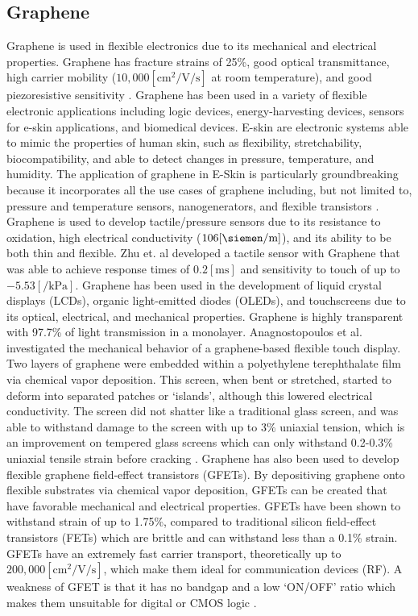 \documentclass[conference]{IEEEtran}
\begin{document}
\subsection{Graphene}

Graphene is used in flexible electronics due to its mechanical and electrical properties. Graphene has fracture strains of 25\%, good optical transmittance, high carrier mobility ($10,000[\si{\centi\meter\squared\per\volt\per\second}]$ at room temperature), and good piezoresistive sensitivity \cite{tc1}. Graphene has been used in a variety of flexible electronic applications including logic devices, energy-harvesting devices, sensors for e-skin applications, and biomedical devices. E-skin are electronic systems able to mimic the properties of human skin, such as flexibility, stretchability, biocompatibility, and able to detect changes in pressure, temperature, and humidity. The application of graphene in E-Skin is particularly groundbreaking because it incorporates all the use cases of graphene including, but not limited to, pressure and temperature sensors, nanogenerators, and flexible transistors \cite{tc1}. Graphene is used to develop tactile/pressure sensors due to its resistance to oxidation, high electrical conductivity ($106[\si{\siemen\per\meter}]$), and its ability to be both thin and flexible. Zhu et. al \cite{tc5} developed a tactile sensor with Graphene that was able to achieve response times of $0.2[\si{\milli\second}]$ and sensitivity to touch of up to $-5.53[\si{\per\kilo\pascal}]$. Graphene has been used in the development of liquid crystal displays (LCDs), organic light-emitted diodes (OLEDs), and touchscreens due to its optical, electrical, and mechanical properties. Graphene is highly transparent with 97.7\% of light transmission in a monolayer. Anagnostopoulos et al. \cite{tc6} investigated the mechanical behavior of a graphene-based flexible touch display. Two layers of graphene were embedded within a polyethylene terephthalate film via chemical vapor deposition. This screen, when bent or stretched, started to deform into separated patches or `islands', although this lowered electrical conductivity. The screen did not shatter like a traditional glass screen, and was able to withstand damage to the screen with up to 3\% uniaxial tension, which is an improvement on tempered glass screens which can only withstand 0.2-0.3\% uniaxial tensile strain before cracking \cite{tc6}. Graphene has also been used to develop flexible graphene field-effect transistors (GFETs). By depositiving graphene onto flexible substrates via chemical vapor deposition, GFETs can be created that have favorable mechanical and electrical properties. GFETs have been shown to withstand strain of up to 1.75\%, compared to traditional silicon field-effect transistors (FETs) which are brittle and can withstand less than a 0.1\% strain. GFETs have an extremely fast carrier transport, theoretically up to $200,000[\si{\centi\meter\squared\per\volt\per\second}]$, which make them ideal for communication devices (RF). A weakness of GFET is that it has no bandgap and a low `\textsc{ON/OFF}' ratio which makes them unsuitable for digital or CMOS logic \cite{tc7}.
\end{document}
